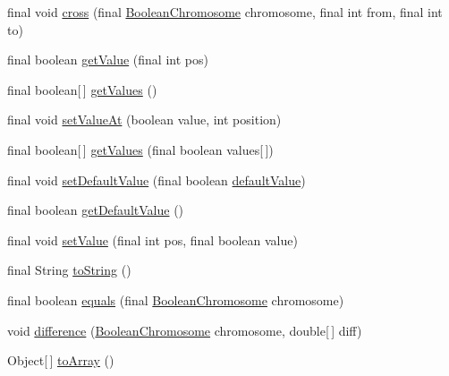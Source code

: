 \begin{DoxyCompactItemize}
\item 
final void \hyperlink{classjenes_1_1chromosome_1_1_boolean_chromosome_af31ce0ed4f82fccd837cfde93bc4ee61}{cross} (final \hyperlink{classjenes_1_1chromosome_1_1_boolean_chromosome}{Boolean\-Chromosome} chromosome, final int from, final int to)
\item 
final boolean \hyperlink{classjenes_1_1chromosome_1_1_boolean_chromosome_a6edb214f001732cfd6af9bbac3a23515}{get\-Value} (final int pos)
\item 
final boolean\mbox{[}$\,$\mbox{]} \hyperlink{classjenes_1_1chromosome_1_1_boolean_chromosome_a27db9ee77a97d896d0cdafc726681272}{get\-Values} ()
\item 
final void \hyperlink{classjenes_1_1chromosome_1_1_boolean_chromosome_a9bd35e276f2739f19fa7a695c85f415c}{set\-Value\-At} (boolean value, int position)
\item 
final boolean\mbox{[}$\,$\mbox{]} \hyperlink{classjenes_1_1chromosome_1_1_boolean_chromosome_aafccb6ebf217d02c0502e185b1972f82}{get\-Values} (final boolean values\mbox{[}$\,$\mbox{]})
\item 
final void \hyperlink{classjenes_1_1chromosome_1_1_boolean_chromosome_a3730cbcd4d048349f134593db820566d}{set\-Default\-Value} (final boolean \hyperlink{classjenes_1_1chromosome_1_1_boolean_chromosome_aa91a13c17d9a481a3ec56cc4ac9a1fd0}{default\-Value})
\item 
final boolean \hyperlink{classjenes_1_1chromosome_1_1_boolean_chromosome_a9b75f626b2b5fbc90215a53ac91d24a7}{get\-Default\-Value} ()
\item 
final void \hyperlink{classjenes_1_1chromosome_1_1_boolean_chromosome_ab37e05ed7a30e43b740f0c2d9c548e88}{set\-Value} (final int pos, final boolean value)
\item 
final String \hyperlink{classjenes_1_1chromosome_1_1_boolean_chromosome_a17ecce8325cc2ba6b1703551768c245f}{to\-String} ()
\item 
final boolean \hyperlink{classjenes_1_1chromosome_1_1_boolean_chromosome_a82b50fe50a7e8821ee3ae5cc96bca013}{equals} (final \hyperlink{classjenes_1_1chromosome_1_1_boolean_chromosome}{Boolean\-Chromosome} chromosome)
\item 
void \hyperlink{classjenes_1_1chromosome_1_1_boolean_chromosome_a0d602ca5a958ee2712963602d2f1eee9}{difference} (\hyperlink{classjenes_1_1chromosome_1_1_boolean_chromosome}{Boolean\-Chromosome} chromosome, double\mbox{[}$\,$\mbox{]} diff)
\item 
Object\mbox{[}$\,$\mbox{]} \hyperlink{classjenes_1_1chromosome_1_1_boolean_chromosome_a3ff06b819a640b0e89935d99cc69d3ac}{to\-Array} ()
\end{DoxyCompactItemize}
